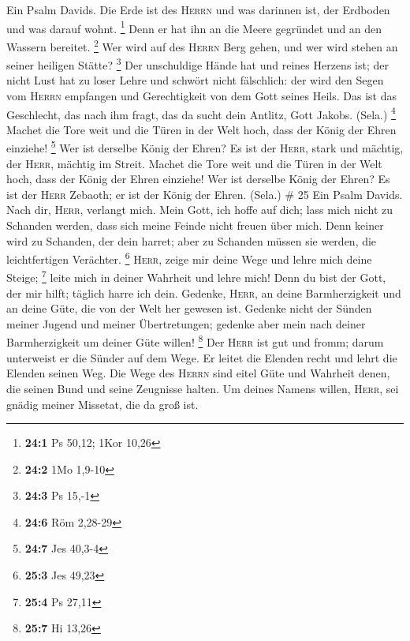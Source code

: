  Ein Psalm Davids. Die Erde ist des \textsc{Herrn} und was
darinnen ist, der Erdboden und was darauf wohnt. \footnote{\textbf{24:1}
  Ps 50,12; 1Kor 10,26}  Denn er hat ihn an die Meere
gegründet und an den Wassern bereitet. \footnote{\textbf{24:2} 1Mo
  1,9-10}  Wer wird auf des \textsc{Herrn} Berg gehen, und
wer wird stehen an seiner heiligen Stätte? \footnote{\textbf{24:3} Ps
  15,-1}  Der unschuldige Hände hat und reines Herzens
ist; der nicht Lust hat zu loser Lehre und schwört nicht fälschlich:
 der wird den Segen vom \textsc{Herrn} empfangen und
Gerechtigkeit von dem Gott seines Heils.  Das ist das
Geschlecht, das nach ihm fragt, das da sucht dein Antlitz, Gott Jakobs.
(Sela.) \footnote{\textbf{24:6} Röm 2,28-29}  Machet die
Tore weit und die Türen in der Welt hoch, dass der König der Ehren
einziehe! \footnote{\textbf{24:7} Jes 40,3-4}  Wer ist
derselbe König der Ehren? Es ist der \textsc{Herr}, stark und mächtig,
der \textsc{Herr}, mächtig im Streit.  Machet die Tore
weit und die Türen in der Welt hoch, dass der König der Ehren einziehe!
 Wer ist derselbe König der Ehren? Es ist der
\textsc{Herr} Zebaoth; er ist der König der Ehren. (Sela.) \# 25
 Ein Psalm Davids. Nach dir, \textsc{Herr}, verlangt mich.
 Mein Gott, ich hoffe auf dich; lass mich nicht zu
Schanden werden, dass sich meine Feinde nicht freuen über mich.
 Denn keiner wird zu Schanden, der dein harret; aber zu
Schanden müssen sie werden, die leichtfertigen Verächter. \footnote{\textbf{25:3}
  Jes 49,23}  \textsc{Herr}, zeige mir deine Wege und
lehre mich deine Steige; \footnote{\textbf{25:4} Ps 27,11}
 leite mich in deiner Wahrheit und lehre mich! Denn du
bist der Gott, der mir hilft; täglich harre ich dein. 
Gedenke, \textsc{Herr}, an deine Barmherzigkeit und an deine Güte, die
von der Welt her gewesen ist.  Gedenke nicht der Sünden
meiner Jugend und meiner Übertretungen; gedenke aber mein nach deiner
Barmherzigkeit um deiner Güte willen! \footnote{\textbf{25:7} Hi 13,26}
 Der \textsc{Herr} ist gut und fromm; darum unterweist er
die Sünder auf dem Wege.  Er leitet die Elenden recht und
lehrt die Elenden seinen Weg.  Die Wege des
\textsc{Herrn} sind eitel Güte und Wahrheit denen, die seinen Bund und
seine Zeugnisse halten.  Um deines Namens willen,
\textsc{Herr}, sei gnädig meiner Missetat, die da groß ist.
